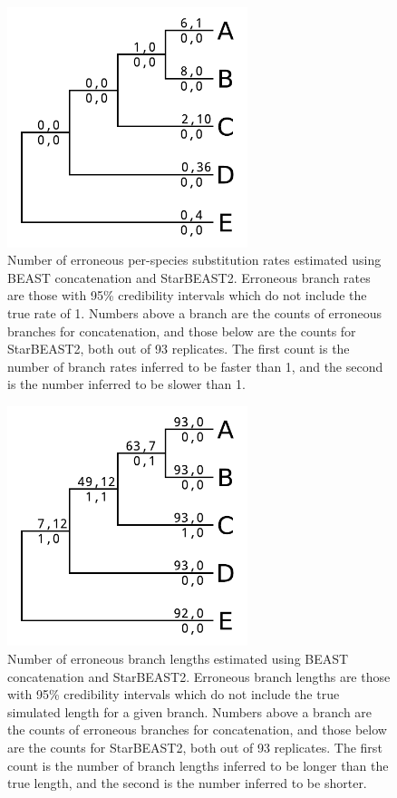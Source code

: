 \documentclass[12pt]{article}
\begin{document}
\clearpage

\begin{figure}[htb!]
\centering
\includegraphics[width=7cm]{false_branch_rates.pdf}
\caption
{Number of erroneous per-species substitution rates estimated using BEAST concatenation and StarBEAST2. Erroneous
branch rates are those with 95\% credibility intervals which do not include the true rate of 1.
Numbers above a branch are the counts of erroneous branches for concatenation, and those
below are the counts for StarBEAST2, both out of 93 replicates. The first count is
the number of branch rates inferred to be faster than 1, and the
second is the number inferred to be slower than 1.}
\label{fig:spilsBranchRates}
\end{figure}

\begin{figure}[htb!]
\centering
\includegraphics[width=7cm]{false_branch_lengths.pdf}
\caption
{Number of erroneous branch lengths estimated using BEAST concatenation and StarBEAST2. Erroneous
branch lengths are those with 95\% credibility intervals which do not include the true simulated length for a given branch.
Numbers above a branch are the counts of erroneous branches for concatenation, and those
below are the counts for StarBEAST2, both out of 93 replicates. The first count is
the number of branch lengths inferred to be longer than the true length, and the
second is the number inferred to be shorter.}
\label{fig:spilsBranchLengths}
\end{figure}
\end{document}
